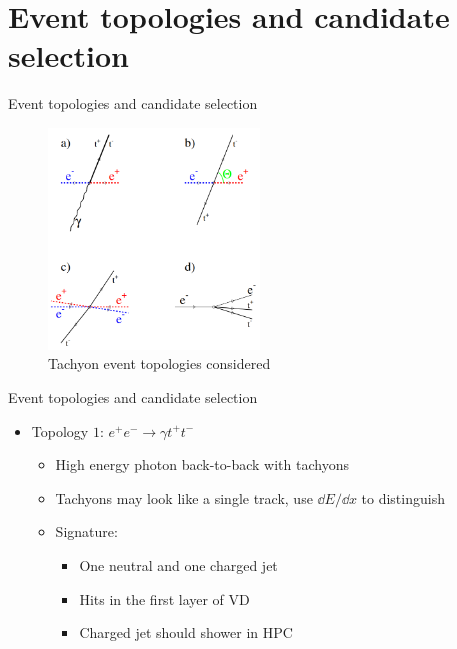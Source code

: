 \documentclass{beamer}
\begin{document}
\section{Event topologies and candidate selection}
\begin{frame}{Event topologies and candidate selection}
  \begin{figure}
    \centering
    \includegraphics[width = 0.5\textwidth]{Topologies.png}
    \caption{Tachyon event topologies considered}
  \end{figure}
\end{frame}

\begin{frame}{Event topologies and candidate selection}
  \begin{itemize}
    \item{Topology $1$: $e^+e^-\to\gamma t^+t^-$}
    \begin{itemize}
      \item{High energy photon back-to-back with tachyons}
      \item{Tachyons may look like a single track, use $\dd{E}/\dd{x}$ to distinguish}
      \item{Signature:}
      \begin{itemize}
        \item{One neutral and one charged jet}
        \item{Hits in the first layer of VD}
        \item{Charged jet should shower in HPC}
      \end{itemize}
    \end{itemize}
  \end{itemize}
\end{frame}
\end{document}
